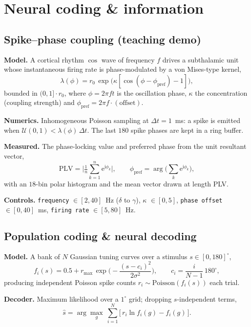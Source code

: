 \documentclass[11pt]{article}
\newcommand{\param}[1]{\textcolor{neonmag}{\texttt{#1}}}
\newcommand{\E}{\mathrm{e}}
\newcommand{\ii}{\mathrm{i}}
\begin{document}
\section{Neural coding \& information}

\subsection{Spike--phase coupling (teaching demo)}

\textbf{Model.} A cortical rhythm $\cos$ wave of frequency $f$ drives a subthalamic unit whose
instantaneous firing rate is phase-modulated by a von Mises-type kernel,
\[
\lambda(\phi) = r_0\, \exp\!\big(\kappa[\cos(\phi-\phi_{\text{pref}})-1]\big),
\]
bounded in $(0,1]\cdot r_0$, where $\phi = 2\pi f t$ is the oscillation phase, $\kappa$ the
concentration (coupling strength) and $\phi_{\text{pref}} = 2\pi f \cdot(\text{offset})$.

\textbf{Numerics.} Inhomogeneous Poisson sampling at $\Delta t = 1$~ms: a spike is emitted when
$\mathcal U(0,1) < \lambda(\phi)\,\Delta t$. The last $180$ spike phases are kept in a ring buffer.

\textbf{Measured.} The phase-locking value and preferred phase from the unit resultant vector,
\[
\text{PLV} = \Big|\tfrac1n\textstyle\sum_{k=1}^{n}\E^{\ii\phi_k}\Big|, \qquad
\phi_{\text{pref}} = \arg\!\Big(\textstyle\sum_k \E^{\ii\phi_k}\Big),
\]
with an $18$-bin polar histogram and the mean vector drawn at length PLV.

\textbf{Controls.} \param{frequency} $\in[2,40]$~Hz ($\delta$ to $\gamma$),
\param{$\kappa$} $\in[0,5]$, \param{phase offset} $\in[0,40]$~ms,
\param{firing rate} $\in[5,80]$~Hz.

\subsection{Population coding \& neural decoding}

\textbf{Model.} A bank of $N$ Gaussian tuning curves over a stimulus $s\in[0,180]^\circ$,
\[
f_i(s) = 0.5 + r_{\max}\,\exp\!\Big(-\frac{(s-c_i)^2}{2\sigma^2}\Big), \qquad
c_i = \frac{i}{N-1}\,180^\circ,
\]
producing independent Poisson spike counts $r_i\sim\text{Poisson}(f_i(s))$ each trial.

\textbf{Decoder.} Maximum likelihood over a $1^\circ$ grid; dropping $s$-independent terms,
\[
\hat s = \arg\max_{g}\ \sum_{i=1}^{N}\big[\,r_i \ln f_i(g) - f_i(g)\,\big].
\]
\end{document}
